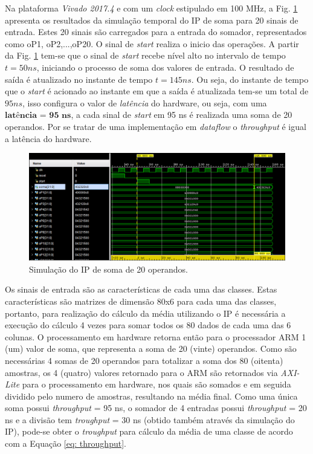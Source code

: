 Na plataforma \textit{Vivado 2017.4} e com um \textit{clock} estipulado em 100 MHz, a Fig. \ref{simulacao_sum} apresenta os resultados da simulação temporal do IP de soma para 20 sinais de entrada. Estes 20 sinais são carregados para a entrada do somador, representados como oP1, oP2,...,oP20. O sinal de \textit{start} realiza o inicio das operações. A partir da Fig. \ref{simulacao_sum} tem-se que o sinal de \textit{start} recebe nível alto no intervalo de tempo $t = 50 ns$, iniciando o processo de soma dos valores de entrada. O resultado de saída é atualizado no instante de tempo $t = 145 ns$. Ou seja, do instante de tempo que o \textit{start} é acionado ao instante em que a saída é atualizada tem-se um total de $95 ns$, isso configura o valor de \textit{latência} do hardware, ou seja, com uma $\textbf{latência = 95 ns}$, a cada sinal de \textit{start} em 95 ns é realizada uma soma de 20 operandos. Por se tratar de uma implementação em \textit{dataflow} o \textit{throughput} é igual a latência do hardware.

\begin{figure}[!h]
	\centering
	\includegraphics[keepaspectratio=true,scale=0.5]{figuras/Simulacao_somatorio.PNG}
	\caption{Simulação do IP de soma de 20 operandos.}
	\label{simulacao_sum}
\end{figure} 


Os sinais de entrada são as características de cada uma das classes. Estas características são matrizes de dimensão 80x6 para cada uma das classes, portanto, para realização do cálculo da média utilizando o IP é necessária a execução do cálculo 4 vezes para somar todos os 80 dados de cada uma das 6 colunas. O processamento em hardware retorna então para o processador ARM 1 (um) valor de soma, que representa a soma de 20 (vinte) operandos. Como são necessárias 4 somas de 20 operandos para totalizar a soma dos 80 (oitenta) amostras, os 4 (quatro) valores retornado para o ARM são retornados via \textit{AXI-Lite} para o processamento em hardware, nos quais são somados e em seguida dividido pelo numero de amostras, resultando na média final. Como uma única soma possui \textit{throughput} = 95 ns, o somador de 4 entradas possui \textit{throughput} = 20 ns e a divisão tem \textit{troughput} = 30 ns (obtido também através da simulação do IP), pode-se obter o \textit{troughput} para cálculo da média de uma classe de acordo com a Equação \ref{eq: throughput}.

